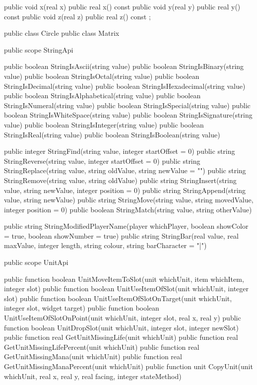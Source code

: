 {{{			public void x(real x)
			public real x() const
			public void y(real y)
			public real y() const
			public void z(real z)
			public real z() const
		};

		public class Circle
		public class Matrix
	}

	public scope StringApi
	{
		public boolean StringIsAscii(string value)
		public boolean StringIsBinary(string value)
		public boolean StringIsOctal(string value)
		public boolean StringIsDecimal(string value)
		public boolean StringIsHexadecimal(string value)
		public boolean StringIsAlphabetical(string value)
		public boolean StringIsNumeral(string value)
		public boolean StringIsSpecial(string value)
		public boolean StringIsWhiteSpace(string value)
		public boolean StringIsSignature(string value)
		public boolean StringIsInteger(string value)
		public boolean StringIsReal(string value)
		public boolean StringIsBoolean(string value)

		public integer StringFind(string value, integer startOffset = 0)
		public string StringReverse(string value, integer startOffset = 0)
		public string StringReplace(string value, string oldValue, string newValue = "")
		public string StringRemove(string value, string oldValue)
		public string StringInsert(string value, string newValue, integer position = 0)
		public string StringAppend(string value, string newValue)
		public string StringMove(string value, string movedValue, integer position = 0)
		public boolean StringMatch(string value, string otherValue)

		public string StringModifiedPlayerName(player whichPlayer, boolean showColor = true, boolean showNumber = true)
		public string StringBar(real value, real maxValue, integer length, string colour, string barCharacter = "|")
	}

	public scope UnitApi
	{
		public function boolean UnitMoveItemToSlot(unit whichUnit, item whichItem, integer slot)
		public function boolean UnitUseItemOfSlot(unit whichUnit, integer slot)
		public function boolean UnitUseItemOfSlotOnTarget(unit whichUnit, integer slot, widget target)
		public function boolean UnitUseItemOfSlotOnPoint(unit whichUnit, integer slot, real x, real y)
		public function boolean UnitDropSlot(unit whichUnit, integer slot, integer newSlot)
		public function real GetUnitMissingLife(unit whichUnit)
		public function real GetUnitMissingLifePercent(unit whichUnit)
		public function real GetUnitMissingMana(unit whichUnit)
		public function real GetUnitMissingManaPercent(unit whichUnit)
		public function unit CopyUnit(unit whichUnit, real x, real y, real facing, integer stateMethod)
		
}}
